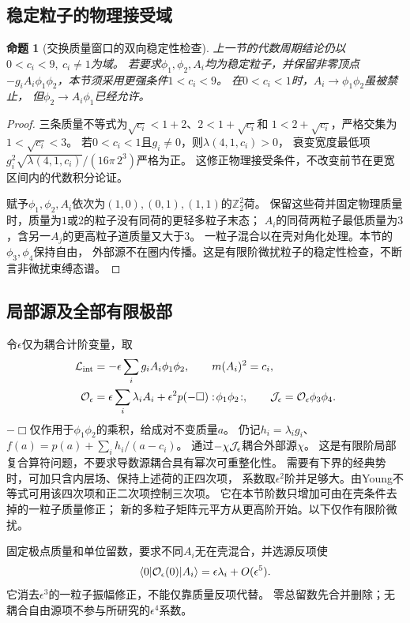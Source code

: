 \documentclass[11pt,a4paper]{ctexart}
\theoremstyle{cnplain}\newtheorem{theorem}{定理}[section]
\newtheorem{proposition}[theorem]{命题}
\theoremstyle{definition}\newtheorem{definition}[theorem]{定义}
\theoremstyle{remark}\newtheorem{remark}[theorem]{注}
\begin{document}
\subsection{稳定粒子的物理接受域}
\begin{proposition}[交换质量窗口的双向稳定性检查]\label{prop:sourcewindow}
上一节的代数周期结论仍以$0<c_i<9,\ c_i\ne1$为域。
若要求$\phi_1,\phi_2,A_i$均为稳定粒子，并保留非零顶点
$-g_i A_i\phi_1\phi_2$，本节须采用更强条件$1<c_i<9$。
在$0<c_i<1$时，$A_i\to\phi_1\phi_2$虽被禁止，
但$\phi_2\to A_i\phi_1$已经允许。
\end{proposition}
\begin{proof}
三条质量不等式为$\sqrt{c_i}<1+2$、$2<1+\sqrt{c_i}$和
$1<2+\sqrt{c_i}$，严格交集为$1<\sqrt{c_i}<3$。
若$0<c_i<1$且$g_i\ne0$，则$\lambda(4,1,c_i)>0$，
衰变宽度最低项$g_i^2\sqrt{\lambda(4,1,c_i)}/(16\pi\,2^3)$严格为正。
这修正物理接受条件，不改变前节在更宽区间内的代数积分论证。

赋予$\phi_1,\phi_2,A_i$依次为$(1,0),(0,1),(1,1)$的$\mathbb Z_2^2$荷。
保留这些荷并固定物理质量时，质量为$1$或$2$的粒子没有同荷的更轻多粒子末态；
$A_i$的同荷两粒子最低质量为$3$，含另一$A_j$的更高粒子道质量又大于$3$。
一粒子混合以在壳对角化处理。本节的$\phi_3,\phi_4$保持自由，
外部源不在圈内传播。这是有限阶微扰粒子的稳定性检查，不断言非微扰束缚态谱。
\end{proof}

\subsection{局部源及全部有限极部}
令$\epsilon$仅为耦合计阶变量，取
\begin{align}
 {\cal L}_{\rm int}&=-\epsilon\sum_i g_i A_i\phi_1\phi_2,
 \qquad m(A_i)^2=c_i, \label{eq:sourcebulk}\\
 {\cal O}_\epsilon&=\epsilon\sum_i\lambda_i A_i+
       \epsilon^2p(-\Box):\!\phi_1\phi_2\!:,\qquad
 {\cal J}_\epsilon={\cal O}_\epsilon\phi_3\phi_4 .
 \label{eq:sourceoperator}
\end{align}
$-\Box$仅作用于$\phi_1\phi_2$的乘积，给成对不变质量$a$。
仍记$h_i=\lambda_i g_i$、$f(a)=p(a)+\sum_i h_i/(a-c_i)$。
通过$-\chi{\cal J}_\epsilon$耦合外部源$\chi$。
这是有限阶局部复合算符问题，不要求导数源耦合具有幂次可重整化性。
需要有下界的经典势时，可加只含内层场、保持上述荷的正四次项，
系数取$\epsilon^2$阶并足够大。由Young不等式可用该四次项和正二次项控制三次项。
它在本节阶数只增加可由在壳条件去掉的一粒子质量修正；
新的多粒子矩阵元平方从更高阶开始。以下仅作有限阶微扰。

固定极点质量和单位留数，要求不同$A_i$无在壳混合，并选源反项使
\begin{equation}\label{eq:sourceonshell}
 \langle0|{\cal O}_\epsilon(0)|A_i\rangle
       =\epsilon\lambda_i+O(\epsilon^5).
\end{equation}
它消去$\epsilon^3$的一粒子振幅修正，不能仅靠质量反项代替。
零总留数先合并删除；无耦合自由源项不参与所研究的$\epsilon^4$系数。
\end{document}
